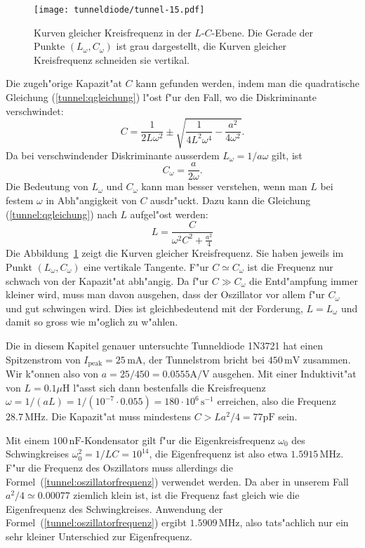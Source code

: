 \begin{figure}
\centering
\texttt{[image: tunneldiode/tunnel-15.pdf]}
\caption{Kurven gleicher Kreisfrequenz in der $L$-$C$-Ebene.
Die Gerade der Punkte $(L_\omega,C_\omega)$ ist grau dargestellt,
die Kurven gleicher Kreisfrequenz schneiden sie vertikal.
\label{tunnel:lcabhaengigkeit}}
\end{figure}

Die zugeh"orige Kapazit"at $C$ kann gefunden werden, indem man die quadratische
Gleichung (\ref{tunnel:qgleichung}) l"ost f"ur den Fall, wo die
Diskriminante verschwindet:
\[
C=\frac{1}{2L\omega^2}
\pm
\sqrt{\frac{1}{4L^2\omega^4}-\frac{a^2}{4\omega^2}}.
\]
Da bei verschwindender Diskriminante ausserdem $L_\omega=1/a\omega$ gilt, ist 
\[
C_\omega=\frac{a}{2\omega}.
\]
Die Bedeutung von $L_\omega$ und $C_\omega$ kann man besser verstehen,
wenn man $L$ bei festem $\omega$ in Abh"angigkeit von $C$ ausdr"uckt.
Dazu kann die Gleichung (\ref{tunnel:qgleichung}) nach $L$ aufgel"ost werden:
\[
L=\frac{C}{\displaystyle\omega^2C^2+\frac{a^2}4}
\]
Die Abbildung~\ref{tunnel:lcabhaengigkeit} zeigt die Kurven gleicher
Kreisfrequenz.
Sie haben jeweils im Punkt $(L_\omega,C_\omega)$ eine vertikale Tangente.
F"ur $C\simeq C_\omega$ ist die Frequenz nur schwach von der Kapazit"at
abh"angig.
Da f"ur $C\gg C_\omega$ die Entd"ampfung immer kleiner wird, muss
man davon ausgehen, dass der Oszillator vor allem f"ur $C_\omega$
und gut schwingen wird.
Dies ist gleichbedeutend mit der Forderung, $L=L_\omega$ und damit
so gross wie m"oglich zu w"ahlen.

\begin{beispiel}
Die in diesem Kapitel genauer untersuchte Tunneldiode 1N3721 hat einen
Spitzenstrom von $I_{\text{peak}}=25\,\text{mA}$, der Tunnelstrom
bricht bei $450\,\text{mV}$ zusammen.
Wir k"onnen also von $a=25/450=0.0555\text{A/V}$ ausgehen.
Mit einer Induktivit"at von $L=0.1\mu\text{H}$ l"asst sich dann bestenfalls
die Kreisfrequenz
$\omega=1/(aL)=1/(10^{-7}\cdot 0.055)=180\cdot 10^6\,\text{s}^{-1}$
erreichen,
also die Frequenz $28.7\,\text{MHz}$.
Die Kapazit"at muss mindestens $C>La^2/4=77\text{pF}$ sein.

Mit einem $100\,\text{nF}$-Kondensator gilt f"ur die Eigenkreisfrequenz
$\omega_0$ des Schwingkreises $\omega_0^2=1/LC=10^{14}$, die Eigenfrequenz
ist also etwa $1.5915\,\text{MHz}$.
F"ur die Frequenz des Oszillators muss allerdings die
Formel~(\ref{tunnel:oszillatorfrequenz}) verwendet werden.
Da aber in unserem Fall $a^2/4\simeq 0.00077$ ziemlich klein ist, ist
die Frequenz fast gleich wie die Eigenfrequenz des Schwingkreises.
Anwendung der Formel~(\ref{tunnel:oszillatorfrequenz})
ergibt $1.5909\,\text{MHz}$, also tats"achlich nur ein sehr kleiner
Unterschied zur Eigenfrequenz.
\end{beispiel}

